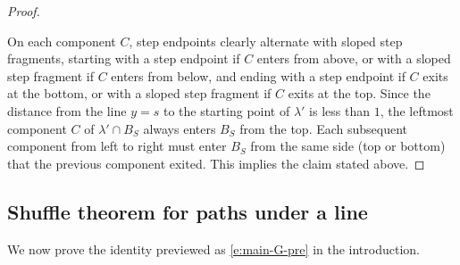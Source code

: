 \documentclass[12pt]{amsart}
\theoremstyle{definition}
\theoremstyle{remark}
\begin{document}
\begin{proof}
\begin{figure}
\caption{\label{fig:band-components}}
\end{figure}

On each component $C$, step endpoints clearly alternate with sloped
step fragments, starting with a step endpoint if $C$ enters from
above, or with a sloped step fragment if $C$ enters from below, and
ending with a step endpoint if $C$ exits at the bottom, or with a
sloped step fragment if $C$ exits at the top.  Since the distance from
the line $y=s$ to the starting point of $\lambda '$ is less than $1$,
the leftmost component $C$ of $\lambda '\cap B_{S}$ always enters
$B_{S}$ from the top.  Each subsequent component from left to right
must enter $B_{S}$ from the same side (top or bottom) that the
previous component exited.  This implies the claim stated above.
\end{proof}


\subsection{Shuffle theorem for paths under a line}
\label{ss:main-G}

We now prove the identity previewed as \eqref{e:main-G-pre} in the
introduction.
\end{document}
